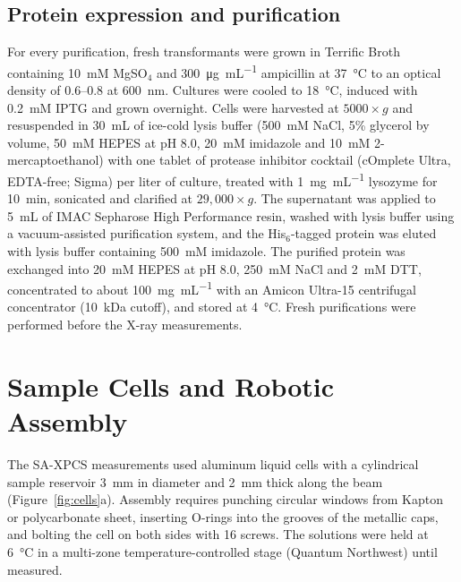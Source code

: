 \documentclass[11pt]{article}
\begin{document}
\subsection{Protein expression and purification}

For every purification, fresh transformants were grown in Terrific Broth containing 10~mM MgSO$_4$ and \SI{300}{\micro\gram\per\milli\liter} ampicillin at \SI{37}{\degreeCelsius} to an optical density of 0.6--0.8 at 600~nm. Cultures were cooled to \SI{18}{\degreeCelsius}, induced with 0.2~mM IPTG and grown overnight. Cells were harvested at $5000\times g$ and resuspended in \SI{30}{\milli\liter} of ice-cold lysis buffer (500~mM NaCl, 5\% glycerol by volume, 50~mM HEPES at pH 8.0, 20~mM imidazole and 10~mM 2-mercaptoethanol) with one tablet of protease inhibitor cocktail (cOmplete Ultra, EDTA-free; Sigma) per liter of culture, treated with \SI{1}{\milli\gram\per\milli\liter} lysozyme for 10~min, sonicated and clarified at $29{,}000\times g$.\cite{Makowska-Grzyska2014-cz} The supernatant was applied to \SI{5}{\milli\liter} of IMAC Sepharose High Performance resin, washed with lysis buffer using a vacuum-assisted purification system, and the His$_6$-tagged protein was eluted with lysis buffer containing 500~mM imidazole. The purified protein was exchanged into 20~mM HEPES at pH 8.0, 250~mM NaCl and 2~mM DTT, concentrated to about \SI{100}{\milli\gram\per\milli\liter} with an Amicon Ultra-15 centrifugal concentrator (10~kDa cutoff), and stored at \SI{4}{\degreeCelsius}. Fresh purifications were performed before the X-ray measurements.

\section{Sample Cells and Robotic Assembly}

The SA-XPCS measurements used aluminum liquid cells with a cylindrical sample reservoir \SI{3}{\milli\meter} in diameter and \SI{2}{\milli\meter} thick along the beam (Figure~\ref{fig:cells}a). Assembly requires punching circular windows from Kapton or polycarbonate sheet, inserting O-rings into the grooves of the metallic caps, and bolting the cell on both sides with 16 screws. The solutions were held at \SI{6}{\degreeCelsius} in a multi-zone temperature-controlled stage (Quantum Northwest) until measured.
\end{document}
